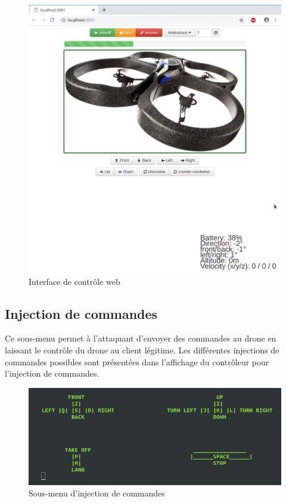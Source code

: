 \begin{figure}[H]
  \centering
  \includegraphics[scale=0.3]{images/control_application.png}
  \caption{Interface de contrôle web}
\end{figure}

\subsection{Injection de commandes}
Ce sous-menu permet à l'attaquant d'envoyer des commandes au drone en laissant le contrôle du drone au client légitime. Les différentes injections de commandes possibles sont présentées dans l'affichage du contrôleur pour l'injection de commandes.

\begin{figure}[H]
  \centering
  \includegraphics[scale=0.6]{images/injection_command_controler.png}
  \caption{Sous-menu d'injection de commandes}
\end{figure}

